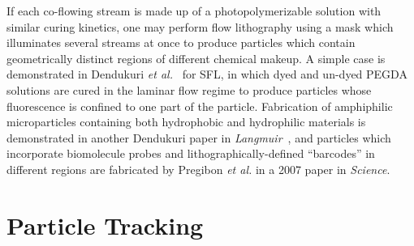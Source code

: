 If each co-flowing stream is made up of a photopolymerizable solution with similar curing kinetics, one may perform
flow lithography using a mask which illuminates several streams at once to produce particles which contain geometrically
distinct regions of different chemical makeup.  A simple case 
is demonstrated in Dendukuri \textit{et al.}~\cite{dendukuri-sfl}
for SFL, in which dyed and un-dyed PEGDA solutions are cured in the laminar flow regime to produce particles whose
fluorescence is confined to one part of the particle.  Fabrication of amphiphilic microparticles containing both
hydrophobic and hydrophilic materials is demonstrated in another Dendukuri paper in 
\textit{Langmuir}~\cite{dendukuri-amph}, and particles which incorporate biomolecule probes and lithographically-defined
``barcodes'' in different regions are fabricated by Pregibon \textit{et al.} in a 2007 paper in 
\textit{Science}.~\cite{pregibon-dna}

\section{Particle Tracking}

\begin{itemize}
\end{itemize}
